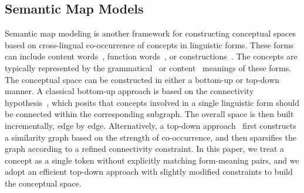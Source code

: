 
\subsection{Semantic Map Models}
Semantic map modeling is another framework for constructing conceptual spaces based on cross-lingual co-occurrence of concepts in linguistic forms. These forms can include content words~\cite{guo2012adjectives,cysouw2007building,perrin2010polysemous}, function words~\cite{zhang2017semantic}, or constructions~\cite{malchukov2007ditransitive}. The concepts are typically represented by the grammatical~\cite{zhang2017semantic} or content~\cite{guo2012adjectives} meanings of these forms. The conceptual space can be constructed in either a bottom-up or top-down manner. A classical bottom-up approach is based on the connectivity hypothesis~\cite{croft2001radical,haspelmath2003geometry,ma2015semantic_en}, which posits that concepts involved in a single linguistic form should be connected within the corresponding subgraph. The overall space is then built incrementally, edge by edge. Alternatively, a top-down approach~\cite{liu2024top} first constructs a similarity graph based on the strength of co-occurrence, and then sparsifies the graph according to a refined connectivity constraint. In this paper, we treat a concept as a single token without explicitly matching form-meaning pairs, and we adopt an efficient top-down approach with slightly modified constraints to build the conceptual space.



